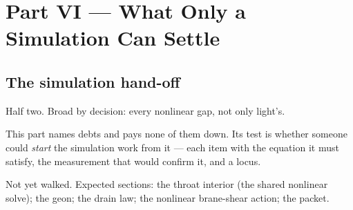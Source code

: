 \part{Part VI --- What Only a Simulation Can Settle}

\chapter{The simulation hand-off}

Half two. Broad by decision: every nonlinear gap, not only light's.

This part names debts and pays none of them down. Its test is whether someone
could \emph{start} the simulation work from it --- each item with the equation
it must satisfy, the measurement that would confirm it, and a locus.

Not yet walked. Expected sections: the throat interior (the shared nonlinear
solve); the geon; the drain law; the nonlinear brane-shear action; the packet.
